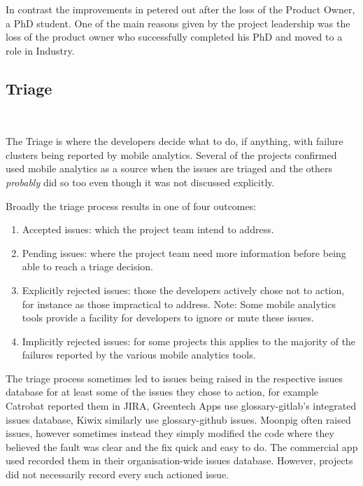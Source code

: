 In contrast the improvements in  petered out after the loss of the Product Owner, a PhD student. One of the main reasons given by the project leadership was the loss of the product owner who successfully completed his PhD and moved to a role in Industry. 


\subsection{Triage}~\label{aiu-triage-theme}

The Triage is where the developers decide what to do, if anything, with failure clusters being reported by mobile analytics. Several of the projects confirmed used mobile analytics as a source when the issues are triaged and the others \textit{probably} did so too even though it was not discussed explicitly.

Broadly the triage process results in one of four outcomes:
\begin{enumerate}
    \item Accepted issues: which the project team intend to address.
    \item Pending issues: where the project team need more information before being able to reach a triage decision.
    \item Explicitly rejected issues: those the developers actively chose not to action, for instance as those impractical to address. Note: Some mobile analytics tools provide a facility for developers to ignore or mute these issues.
    \item Implicitly rejected issues: for some projects this applies to the majority of the failures reported by the various mobile analytics tools.
\end{enumerate}

The triage process sometimes led to issues being raised in the respective issues database for at least some of the issues they chose to action, for example Catrobat reported them in JIRA, Greentech Apps use \Gls{glossary-gitlab}'s integrated issues database, Kiwix similarly use \gls{glossary-github} issues. Moonpig often raised issues, however sometimes instead they simply modified the code where they believed the fault was clear and the fix quick and easy to do. The commercial app used recorded them in their organisation-wide issues database. However, projects did not necessarily record every such actioned issue. 

